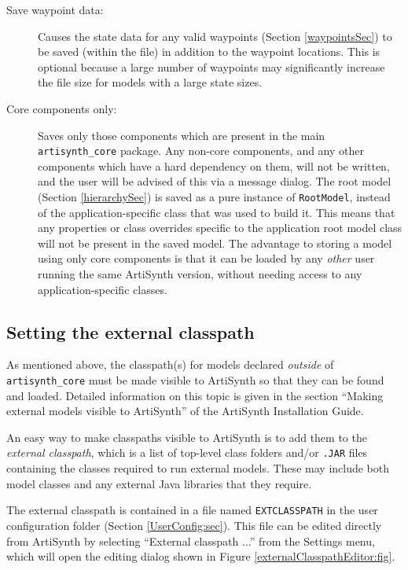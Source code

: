 \documentclass{article}
\begin{document}
\begin{description}

\item[Save waypoint data:] \mbox{}

Causes the state data for any valid waypoints (Section
\ref{waypointsSec}) to be saved (within the file) in addition to the
waypoint locations.  This is optional because a large number of
waypoints may significantly increase the file size for models with a
large state sizes.

\item[Core components only:] \mbox{}

Saves only those components which are
present in the main {\tt artisynth\_core} package. Any non-core
components, and any other components which have a hard dependency on
them, will not be written, and the user will be advised of this via a
message dialog.  The root model (Section \ref{hierarchySec}) is saved
as a pure instance of {\tt RootModel}, instead of the
application-specific class that was used to build it. This means that
any properties or class overrides specific to the application root
model class will not be present in the saved model. The advantage to
storing a model using only core components is that it can be loaded by
any {\it other} user running the same ArtiSynth version, without needing
access to any application-specific classes.

\end{description}

\subsection{Setting the external classpath}
\label{externalClassPath:sec}

As mentioned above, the classpath(s) for models declared {\it outside}
of {\tt artisynth\_core} must be made visible to ArtiSynth so that
they can be found and loaded. Detailed information on this topic is
given in the section ``Making external models visible to ArtiSynth''
of the ArtiSynth Installation Guide.

An easy way to make classpaths visible to ArtiSynth is to add them to
the {\it external classpath}, which is a list of top-level class
folders and/or {\tt .JAR} files containing the classes required to run
external models. These may include both model classes and any external
Java libraries that they require.

The external classpath is contained in a file named {\tt EXTCLASSPATH}
in the user configuration folder (Section \ref{UserConfig:sec}). This
file can be edited directly from ArtiSynth by selecting {\sf ``External
classpath ...''} from the {\sf Settings} menu, which will open the
editing dialog shown in Figure \ref{externalClasspathEditor:fig}.
\end{document}
